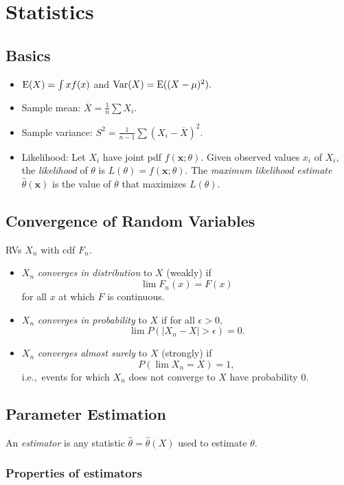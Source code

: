 \documentclass[../ds]{subfiles}
\begin{document}
\chapter{Statistics}
\section{Basics}
\begin{itemize}
	\item $\operatorname{E}(X) = \int xf(x)$ and $\operatorname{Var}(X) = \operatorname{E}((X-\mu)^2).$
	\item Sample mean: $\overline{X} = \frac{1}{n}\sum X_i.$
	\item Sample variance: $S^2 = \frac{1}{n-1}\sum (X_i - \overline{X})^2.$
	\item Likelihood: Let $X_i$ have joint pdf $f(\mathbf{x};\theta).$ Given observed values $x_i$ of $X_i,$ the \textit{likelihood} of $\theta$ is $L(\theta) = f(\mathbf{x};\theta).$ The \textit{maximum likelihood estimate} $\hat{\theta}(\mathbf{x})$ is the value of $\theta$ that maximizes $L(\theta).$
\end{itemize}

\section{Convergence of Random Variables}
RVs $X_n$ with cdf $F_n.$
\begin{itemize}
	\item $X_n$ \textit{converges in distribution} to $X$ (weakly) if \[\lim F_n(x) = F(x)\] for all $x$ at which $F$ is continuous.
	\item $X_n$ \textit{converges in probability} to $X$ if for all $\epsilon > 0,$
	\[ \lim P(|X_n - X| > \epsilon) = 0. \]
	\item $X_n$ \textit{converges almost surely} to $X$ (strongly) if 
	\[ P\left(\lim X_n = X\right) = 1, \]
	i.e.,\ events for which $X_n$ does not converge to $X$ have probability $0.$
\end{itemize}

\section{Parameter Estimation}
An \textit{estimator} is any statistic $\hat{\theta} = \hat{\theta}(X)$ used to estimate $\theta.$

\subsection{Properties of estimators}
\end{document}

